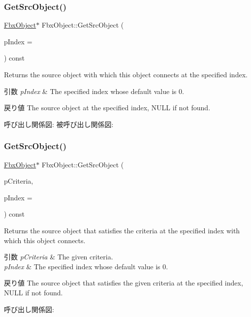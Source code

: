 \subsubsection{\texorpdfstring{Get\+Src\+Object()}{GetSrcObject()}\hspace{0.1cm}{\footnotesize\ttfamily [1/4]}}
{\footnotesize\ttfamily \hyperlink{class_fbx_object}{Fbx\+Object}$\ast$ Fbx\+Object\+::\+Get\+Src\+Object (\begin{DoxyParamCaption}\item[{int}]{p\+Index = {} }\end{DoxyParamCaption}) const}

Returns the source object with which this object connects at the specified index. 
\begin{DoxyParams}{引数}
{\em p\+Index} & The specified index whose default value is 0. \\
\hline
\end{DoxyParams}
\begin{DoxyReturn}{戻り値}
The source object at the specified index, N\+U\+LL if not found. 
\end{DoxyReturn}
呼び出し関係図\+:
被呼び出し関係図\+:
\mbox{\label{class_fbx_object_aff6aab5c2f62092af5a36d6720e3db25}} 
\subsubsection{\texorpdfstring{Get\+Src\+Object()}{GetSrcObject()}\hspace{0.1cm}{\footnotesize\ttfamily [2/4]}}
{\footnotesize\ttfamily \hyperlink{class_fbx_object}{Fbx\+Object}$\ast$ Fbx\+Object\+::\+Get\+Src\+Object (\begin{DoxyParamCaption}\item[{const \hyperlink{class_fbx_criteria}{Fbx\+Criteria} \&}]{p\+Criteria,  }\item[{int}]{p\+Index = {} }\end{DoxyParamCaption}) const}

Returns the source object that satisfies the criteria at the specified index with which this object connects. 
\begin{DoxyParams}{引数}
{\em p\+Criteria} & The given criteria. \\
\hline
{\em p\+Index} & The specified index whose default value is 0. \\
\hline
\end{DoxyParams}
\begin{DoxyReturn}{戻り値}
The source object that satisfies the given criteria at the specified index, N\+U\+LL if not found. 
\end{DoxyReturn}
呼び出し関係図\+:
\mbox{\label{class_fbx_object_a82874616164464f8b68c6ceeb78a45db}} 
